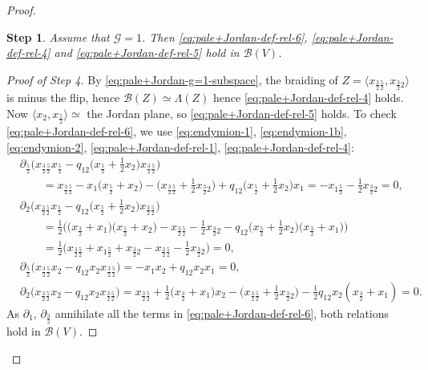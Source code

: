\documentclass[pdftex]{sigma}
\numberwithin{equation}{section}
\newtheorem{stepiv}{Step}
\newcommand{\toba}{\mathscr B}
\newcommand{\ghost}{\mathscr{G}}
\newcommand{\tresdos}{\frac{3}{2}}
\newcommand{\cincodos}{\frac{5}{2}}
\begin{document}
\begin{proof}
\begin{stepiv}
Assume that $\ghost = 1$. Then \eqref{eq:pale+Jordan-def-rel-6}, \eqref{eq:pale+Jordan-def-rel-4} and \eqref{eq:pale+Jordan-def-rel-5}
hold in $\toba(V)$.
\end{stepiv}

\begin{proof}[Proof of Step 4]
By \eqref{eq:pale+Jordan-g=1-subspace}, the braiding of $Z = \big\langle x_{\tresdos\cincodos},x_{\tresdos2}\big\rangle$ is minus the flip, hence
$\toba(Z) \simeq \Lambda(Z)$ hence \eqref{eq:pale+Jordan-def-rel-4} holds.
Now $\langle x_{2}, x_{\cincodos}\rangle \simeq $ the Jordan plane, so \eqref{eq:pale+Jordan-def-rel-5} holds.
To check \eqref{eq:pale+Jordan-def-rel-6}, we use \eqref{eq:endymion-1}, \eqref{eq:endymion-1b}, \eqref{eq:endymion-2}, \eqref{eq:pale+Jordan-def-rel-1}, \eqref{eq:pale+Jordan-def-rel-4}:
\begin{align*}
&\partial_{\cincodos} \big(x_{\tresdos\cincodos}x_{\cincodos}-q_{12}\big(x_{\cincodos}+\tfrac{1}{2}x_{2}\big)x_{\tresdos\cincodos}\big) \\
&\qquad{}=x_{\tresdos\cincodos}-x_1\big(x_{\cincodos}+x_2\big)
-\big(x_{\tresdos\cincodos}+\tfrac{1}{2}x_{\tresdos2}\big)
+q_{12}\big(x_{\cincodos}+\tfrac{1}{2}x_{2}\big)x_1
= -x_{1\cincodos}-\tfrac{1}{2}x_{\tresdos2}=0,
\\
&\partial_{2} \big(x_{\tresdos\cincodos}x_{\cincodos}-q_{12}\big(x_{\cincodos}+\tfrac{1}{2}x_{2}\big)x_{\tresdos\cincodos}\big)
\\
&\qquad{}=\tfrac{1}{2}\big(\big(x_{\tresdos}+x_1\big)\big(x_{\cincodos}+x_2\big)
-x_{\tresdos\cincodos}-\tfrac{1}{2}x_{\tresdos2}
-q_{12}\big(x_{\cincodos}+\tfrac{1}{2}x_{2}\big)\big(x_{\tresdos}+x_1\big)\big)
\\
&\qquad{}
=\tfrac{1}{2}\big(x_{\tresdos\cincodos}+x_{1\cincodos}+x_{\tresdos2}
-x_{\tresdos\cincodos}-\tfrac{1}{2}x_{\tresdos2} \big)=0,
\\
&\partial_{\cincodos} \big(x_{\tresdos\cincodos}x_2-q_{12}x_2x_{\tresdos\cincodos}\big) =
-x_1x_2+q_{12}x_2x_1=0,
\\
& \partial_{2} \big(x_{\tresdos\cincodos}x_2-q_{12}x_2x_{\tresdos\cincodos}\big) =
x_{\tresdos\cincodos}
+\tfrac{1}{2}\big(x_{\tresdos}+x_1\big) x_2
-\big(x_{\tresdos\cincodos}+\tfrac{1}{2}x_{\tresdos2}\big)
-\tfrac{1}{2}q_{12}x_2(x_{\tresdos}+x_1)=0.
\end{align*}
As $\partial_1$, $\partial_{\tresdos}$ annihilate all the terms in \eqref{eq:pale+Jordan-def-rel-6}, both relations hold in $\toba(V)$.
\end{proof}


\end{proof}
\end{document}
